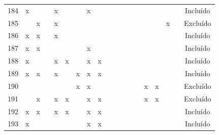 \documentclass[
	12pt,				%
	oneside,			%
	a4paper,			%
	english,			%
	brazil				%
	]{abntex2ppgsi}
\begin{document}
\begin{apendicesenv}
\begin{table}[H]
\begin{tabular}{c | c c c c c c c c | c c c c c c c c c | c}
184 & x &   &   & x &   &   & x &   &   &   &   &   &   &   &   &   &   & Incluído \\
185 &   & x &   & x &   &   &   &   &   &   &   &   &   &   &   & x &   & Excluído \\
186 & x & x &   & x &   &   &   &   &   &   &   &   &   &   &   &   &   & Incluído \\
187 & x & x &   &   &   &   & x &   &   &   &   &   &   &   &   &   &   & Incluído \\
188 & x &   &   & x & x &   & x & x &   &   &   &   &   &   &   &   &   & Incluído \\
189 & x & x &   & x &   & x & x & x &   &   &   &   &   &   &   &   &   & Incluído \\
190 &   &   &   &   &   & x & x &   &   &   &   &   &   & x & x &   &   & Excluído \\
191 &   & x &   & x & x &   & x & x &   &   &   &   &   & x & x &   &   & Excluído \\
192 & x & x &   & x & x &   & x & x &   &   &   &   &   &   &   &   &   & Incluído \\
193 & x &   &   &   &   &   & x & x &   &   &   &   &   &   &   &   &   & Incluído \\
\bottomrule
\end{tabular}
\end{table}



\end{apendicesenv}
\end{document}
